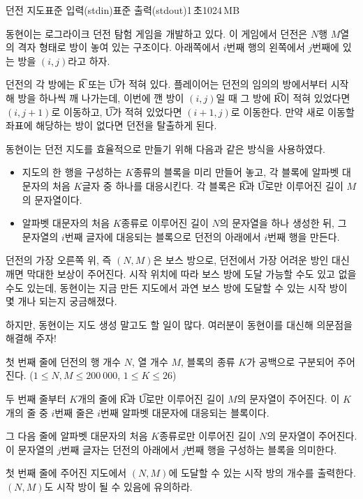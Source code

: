 \begin{problem}{던전 지도}{표준 입력(stdin)}{표준 출력(stdout)}{1\,초}{1024\,MB}

동현이는 로그라이크 던전 탐험 게임을 개발하고 있다. 이 게임에서 던전은 $N$행 $M$열의 격자 형태로 방이 놓여 있는 구조이다. 아래쪽에서 $i$번째 행의 왼쪽에서 $j$번째에 있는 방을 $\left(i, j\right)$라고 하자.

던전의 각 방에는 \t{R} 또는 \t{U}가 적혀 있다. 플레이어는 던전의 임의의 방에서부터 시작해 방을 하나씩 깨 나가는데, 이번에 깬 방이 $\left(i, j\right)$일 때 그 방에 \t{R}이 적혀 있었다면 $\left(i, j + 1\right)$로 이동하고, \t{U}가 적혀 있었다면 $\left(i + 1, j\right)$로 이동한다. 만약 새로 이동할 좌표에 해당하는 방이 없다면 던전을 탈출하게 된다.

동현이는 던전 지도를 효율적으로 만들기 위해 다음과 같은 방식을 사용하였다.
\begin{itemize}
    \item 지도의 한 행을 구성하는 $K$종류의 블록을 미리 만들어 놓고, 각 블록에 알파벳 대문자의 처음 $K$글자 중 하나를 대응시킨다. 각 블록은 \t{R}과 \t{U}로만 이루어진 길이 $M$의 문자열이다.
    \item 알파벳 대문자의 처음 $K$종류로 이루어진 길이 $N$의 문자열을 하나 생성한 뒤, 그 문자열의 $i$번째 글자에 대응되는 블록으로 던전의 아래에서 $i$번째 행을 만든다.
\end{itemize}

던전의 가장 오른쪽 위, 즉 $\left(N, M\right)$은 보스 방으로, 던전에서 가장 어려운 방인 대신 깨면 막대한 보상이 주어진다. 시작 위치에 따라 보스 방에 도달 가능할 수도 있고 없을 수도 있는데, 동현이는 지금 만든 지도에서 과연 보스 방에 도달할 수 있는 시작 방이 몇 개나 되는지 궁금해졌다.

하지만, 동현이는 지도 생성 말고도 할 일이 많다. 여러분이 동현이를 대신해 의문점을 해결해 주자!

\InputFile

첫 번째 줄에 던전의 행 개수 $N$, 열 개수 $M$, 블록의 종류 $K$가 공백으로 구분되어 주어진다. ($1 \leq N, M \leq 200\ 000$, $1 \leq K \leq 26$)

두 번째 줄부터 $K$개의 줄에 \t{R}과 \t{U}로만 이루어진 길이 $M$의 문자열이 주어진다. 이 $K$개의 줄 중 $i$번째 줄은 $i$번째 알파벳 대문자에 대응되는 블록이다.

그 다음 줄에 알파벳 대문자의 처음 $K$종류로만 이루어진 길이 $N$의 문자열이 주어진다. 이 문자열의 $j$번째 글자는 던전의 아래에서 $j$번째 행을 구성하는 블록을 의미한다.

\OutputFile

첫 번째 줄에 주어진 지도에서 $\left(N, M\right)$에 도달할 수 있는 시작 방의 개수를 출력한다. $\left(N, M\right)$도 시작 방이 될 수 있음에 유의하라.

\Examples

\begin{example}
%
%
\end{example}

\end{problem}
